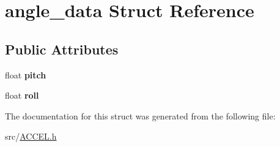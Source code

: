 \hypertarget{structangle__data}{\section{angle\-\_\-data Struct Reference}
\label{structangle__data}
}
\subsection*{Public Attributes}
\begin{DoxyCompactItemize}
\item 
\hypertarget{structangle__data_a324af725e0dc6a70d0d64eb2cd9909c0}{float {\bfseries pitch}}\label{structangle__data_a324af725e0dc6a70d0d64eb2cd9909c0}

\item 
\hypertarget{structangle__data_a2e321203e405b0b78d5cf955dfcdd7ac}{float {\bfseries roll}}\label{structangle__data_a2e321203e405b0b78d5cf955dfcdd7ac}

\end{DoxyCompactItemize}


The documentation for this struct was generated from the following file\-:\begin{DoxyCompactItemize}
\item 
src/\hyperlink{_a_c_c_e_l_8h}{A\-C\-C\-E\-L.\-h}\end{DoxyCompactItemize}
